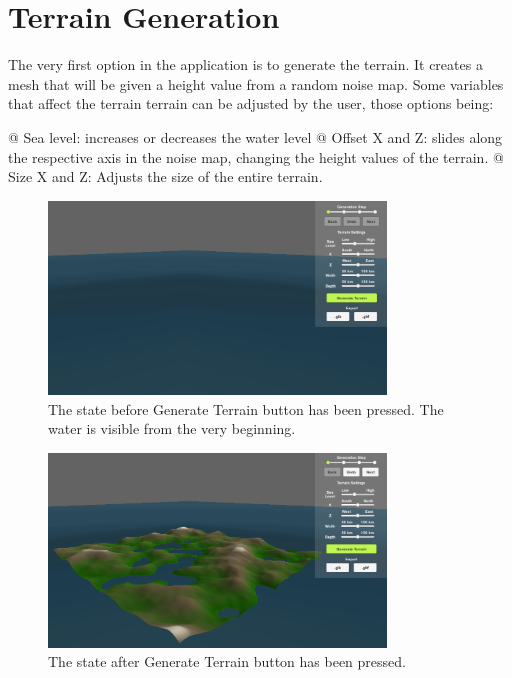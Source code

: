 \section{Terrain Generation}

The very first option in the application is to generate the terrain.
It creates a mesh that will be given a height value from a random noise map.
Some variables that affect the terrain terrain can be adjusted by the user, those options being:

\begin{easylist}
 @ Sea level: increases or decreases the water level
 @ Offset X and Z: slides along the respective axis in the noise map, changing the height values of the terrain.
 @ Size X and Z: Adjusts the size of the entire terrain.
\end{easylist}

\begin{figure}[h!]
  \centering

  \includegraphics[width=0.8\textwidth]{figure/terrain_not_generated.png}
  \caption{The state before Generate Terrain button has been pressed. The water is visible from the very beginning.}

  \label{fig:no_terr}
\end{figure}

\begin{figure}[h!]
  \centering

  \includegraphics[width=0.8\textwidth]{figure/terrain_generated.png}
  \caption{The state after Generate Terrain button has been pressed.}

  \label{fig:terr}
\end{figure}
